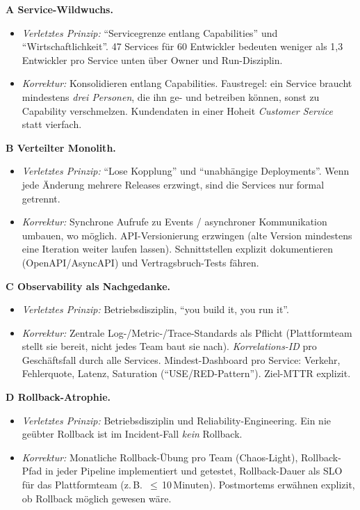 \documentclass[11pt,a4paper,oneside]{article}
\begin{document}
\begin{loesungbox}
\textbf{A \textendash{} Service-Wildwuchs.}
\begin{itemize}
  \item \emph{Verletztes Prinzip:} ``Servicegrenze entlang Capabilities'' und ``Wirtschaftlichkeit''. 47 Services f\"ur 60 Entwickler bedeuten weniger als 1,3 Entwickler pro Service \textendash{} unten \"uber Owner und Run-Disziplin.
  \item \emph{Korrektur:} Konsolidieren entlang Capabilities. Faustregel: ein Service braucht mindestens \emph{drei Personen}, die ihn ge- und betreiben k\"onnen, sonst zu Capability verschmelzen. Kundendaten in einer Hoheit \textendash{} \emph{Customer Service} \textendash{} statt vierfach.
\end{itemize}

\smallskip
\textbf{B \textendash{} Verteilter Monolith.}
\begin{itemize}
  \item \emph{Verletztes Prinzip:} ``Lose Kopplung'' und ``unabh\"angige Deployments''. Wenn jede \"Anderung mehrere Releases erzwingt, sind die Services nur formal getrennt.
  \item \emph{Korrektur:} Synchrone Aufrufe zu Events / asynchroner Kommunikation umbauen, wo m\"oglich. API-Versionierung erzwingen (alte Version mindestens eine Iteration weiter laufen lassen). Schnittstellen explizit dokumentieren (OpenAPI/AsyncAPI) und Vertragsbruch-Tests f\"ahren.
\end{itemize}

\smallskip
\textbf{C \textendash{} Observability als Nachgedanke.}
\begin{itemize}
  \item \emph{Verletztes Prinzip:} Betriebsdisziplin, ``you build it, you run it''.
  \item \emph{Korrektur:} Zentrale Log-/Metric-/Trace-Standards als Pflicht (Plattformteam stellt sie bereit, nicht jedes Team baut sie nach). \emph{Korrelations-ID} pro Gesch\"aftsfall durch alle Services. Mindest-Dashboard pro Service: Verkehr, Fehlerquote, Latenz, Saturation (``USE/RED-Pattern''). Ziel-MTTR explizit.
\end{itemize}

\smallskip
\textbf{D \textendash{} Rollback-Atrophie.}
\begin{itemize}
  \item \emph{Verletztes Prinzip:} Betriebsdisziplin und Reliability-Engineering. Ein nie ge\"ubter Rollback ist im Incident-Fall \emph{kein} Rollback.
  \item \emph{Korrektur:} Monatliche Rollback-\"Ubung pro Team (Chaos-Light), Rollback-Pfad in jeder Pipeline implementiert und getestet, Rollback-Dauer als SLO f\"ur das Plattformteam (z.\,B.\ $\leq$\,10\,Minuten). Postmortems erw\"ahnen explizit, ob Rollback m\"oglich gewesen w\"are.
\end{itemize}
\end{loesungbox}
\end{document}
